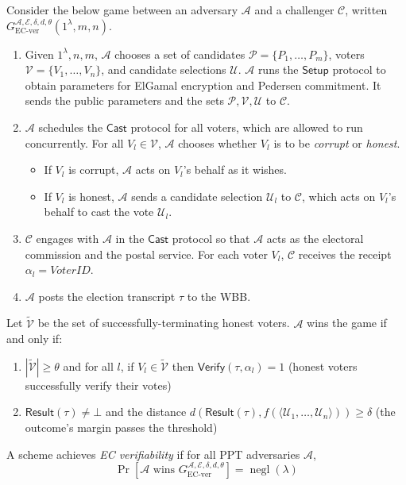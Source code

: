 \documentclass[12pt,a4paper]{article}
\DeclareMathOperator{\negl}{\text{negl}}
\theoremstyle{definition}
\newcommand{\VoterID}{\mathit{VoterID}}
\begin{document}
\begin{definition}[EC Verifiability]
    Consider the below game between an adversary $\mathcal{A}$ and a challenger $\mathcal{C}$, written $G_\text{EC-ver}^{\mathcal{A},\mathcal{E},\delta,d,\theta}(1^\lambda, m, n)$.
    \begin{enumerate}
        \item Given $1^\lambda, n, m$, $\mathcal{A}$ chooses a set of candidates $\mathcal{P}=\{P_1,\ldots,P_m\}$, voters $\mathcal{V}=\{V_1,\ldots,V_n\}$, and candidate selections $\mathcal{U}$. $\mathcal{A}$ runs the $\mathsf{Setup}$ protocol to obtain parameters for ElGamal encryption and Pedersen commitment. It sends the public parameters and the sets $\mathcal{P}, \mathcal{V}, \mathcal{U}$ to $\mathcal{C}$.
        
        \item $\mathcal{A}$ schedules the $\mathsf{Cast}$ protocol for all voters, which are allowed to run concurrently. For all $V_l\in\mathcal{V}$, $\mathcal{A}$ chooses whether $V_l$ is to be \textit{corrupt} or \textit{honest}.
        \begin{itemize}
            \item If $V_l$ is corrupt, $\mathcal{A}$ acts on $V_l$'s behalf as it wishes.
            \item If $V_l$ is honest, $\mathcal{A}$ sends a candidate selection $\mathcal{U}_l$ to $\mathcal{C}$, which acts on $V_l$'s behalf to cast the vote $\mathcal{U}_l$.
        \end{itemize}

        \item $\mathcal{C}$ engages with $\mathcal{A}$ in the $\mathsf{Cast}$ protocol so that $\mathcal{A}$ acts as the electoral commission and the postal service. For each voter $V_l$, $\mathcal{C}$ receives the receipt $\alpha_l=\VoterID$.

        \item $\mathcal{A}$ posts the election transcript $\tau$ to the WBB.
    \end{enumerate}
    Let $\tilde{\mathcal{V}}$ be the set of successfully-terminating honest voters. $\mathcal{A}$ wins the game if and only if:
    \begin{enumerate}
        \item $|\tilde{\mathcal{V}}|\geq\theta$ and for all $l$, if $V_l\in\tilde{\mathcal{V}}$ then $\mathsf{Verify}(\tau, \alpha_l)=1$ (honest voters successfully verify their votes)
        \item $\mathsf{Result}(\tau)\neq\bot$ and the distance $d\left(\mathsf{Result}(\tau), f(\langle \mathcal{U}_1, \ldots, \mathcal{U}_n \rangle)\right)\geq \delta$ (the outcome's margin passes the threshold)
    \end{enumerate}
    A scheme achieves \textit{EC verifiability} if for all PPT adversaries $\mathcal{A}$, $$\Pr\left[\mathcal{A}\text{ wins }G_\text{EC-ver}^{\mathcal{A},\mathcal{E},\delta,d,\theta}\right]=\negl(\lambda)$$
\end{definition}
\end{document}
